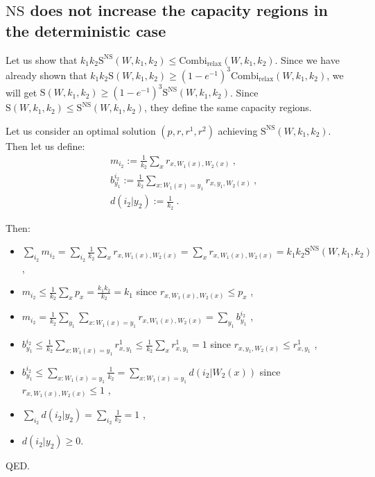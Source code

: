 \documentclass[11pt]{article}
\theoremstyle{definition}
\theoremstyle{remark}
\begin{document}
\subsection{$\mathrm{NS}$ does not increase the capacity regions in the deterministic case}
Let us show that $k_1k_2\mathrm{S}^{\mathrm{NS}}(W,k_1,k_2) \leq \textrm{Combi}_{\text{relax}}(W,k_1,k_2)$. Since we have already shown that $k_1k_2\mathrm{S}(W,k_1,k_2) \geq (1-e^{-1})^3\textrm{Combi}_{\text{relax}}(W,k_1,k_2)$, we will get $\mathrm{S}(W,k_1,k_2) \geq (1-e^{-1})^3\mathrm{S}^{\mathrm{NS}}(W,k_1,k_2)$. Since $\mathrm{S}(W,k_1,k_2) \leq \mathrm{S}^{\mathrm{NS}}(W,k_1,k_2)$, they define the same capacity regions.

Let us consider an optimal solution $(p,r,r^1,r^2)$ achieving $\mathrm{S}^{\mathrm{NS}}(W,k_1,k_2)$. Then let us define:
\begin{equation}
  \begin{aligned}
    &m_{i_2} := \frac{1}{k_2}\sum_x r_{x,W_1(x),W_2(x)} \ ,\\
    &b^{i_2}_{y_1} := \frac{1}{k_2}\sum_{x:W_1(x)=y_1} r_{x,y_1,W_2(x)} \ ,\\
    &d(i_2|y_2) := \frac{1}{k_2} \ .
  \end{aligned}
\end{equation}

Then:
\begin{itemize}
\item $\sum_{i_2} m_{i_2} = \sum_{i_2}\frac{1}{k_2}\sum_x r_{x,W_1(x),W_2(x)} = \sum_x r_{x,W_1(x),W_2(x)} = k_1k_2\mathrm{S}^{\mathrm{NS}}(W,k_1,k_2)$ ,
\item $m_{i_2} \leq \frac{1}{k_2}\sum_x p_x = \frac{k_1k_2}{k_2} = k_1$ since $r_{x,W_1(x),W_2(x)} \leq p_x$ ,
\item $m_{i_2} = \frac{1}{k_2}\sum_{y_1}\sum_{x:W_1(x)=y_1}r_{x,W_1(x),W_2(x)} =\sum_{y_1} b^{i_2}_{y_1}$ ,
\item $b^{i_2}_{y_1} \leq \frac{1}{k_2}\sum_{x:W_1(x)=y_1} r^1_{x,y_1} \leq \frac{1}{k_2}\sum_x r^1_{x,y_1} = 1$ since $r_{x,y_1,W_2(x)} \leq r^1_{x,y_1}$ ,
\item $b^{i_2}_{y_1} \leq \sum_{x:W_1(x)=y_1} \frac{1}{k_2} = \sum_{x:W_1(x)=y_1} d(i_2|W_2(x))$ since $r_{x,W_1(x),W_2(x)} \leq 1$ ,
\item $\sum_{i_2} d(i_2|y_2) = \sum_{i_2} \frac{1}{k_2} = 1$ ,
\item $d(i_2|y_2) \geq 0$.
\end{itemize}

QED.
\end{document}

